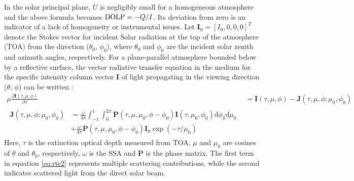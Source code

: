 In the solar principal plane, $U$ is negligibly small for a homogeneous
atmosphere and the above formula becomes $\text{DOLP}=-Q/I$. Its deviation
from zero is an indicator of a lack of homogeneity or instrumental
issues. Let $\mathbf{I}_0=[I_0,0,0,0]^T$ denote the Stokes vector 
for incident Solar radiation at the top of the atmosphere (TOA) from 
the direction ($\theta_0$, $\phi_0$), where $\theta_0$ and $\phi_0$
are the incident solar zenith and azimuth angles, respectively.
For a plane-parallel atmosphere bounded below by a reflective surface, the
vector radiative transfer equation in the medium for the specific intensity
column vector $\mathbf{I}$ of light propagating in the viewing direction 
($\theta$, $\phi$) can be written \citep{Hovenier04, Mishchenko02}:
\begin{align}
\mu \frac{\partial \mathbf{I}(\tau,\mu,\phi)}{\partial \tau} &=
    \mathbf{I}(\tau,\mu,\phi) - \mathbf{J}(\tau,\mu,\phi; \mu_0, \phi_0)
    \label{eq:rte} \\
\begin{split}
\mathbf{J}(\tau,\mu,\phi; \mu_0, \phi_0) &= 
     \frac{\omega}{4\pi}\int_{-1}^{1}\int_{0}^{2\pi} 
     \mathbf{P}(\tau,\mu,\mu_0,\phi-\phi_0) 
     \mathbf{I}(\tau,\mu_0,\phi_0)\text{d}\phi_0\text{d}\mu_0  \\
     & + \frac{\omega}{4\pi}\mathbf{P}(\tau,\mu,\mu_0,\phi-\phi_0)
     \mathbf{I}_0 \exp(-\tau/\mu_0)
     \label{eq:rte2}
\end{split}
\end{align}
Here, $\tau$ is the extinction optical depth measured from TOA, $\mu$ and
$\mu_0$ are cosines of $\theta$ and $\theta_0$, respectively, $\omega$ is the
SSA and $\mathbf{P}$ is the phase matrix. The first term in equation
\eqref{eq:rte2} represents multiple scattering contributions, while
the second indicates scattered light from the direct solar beam. 

